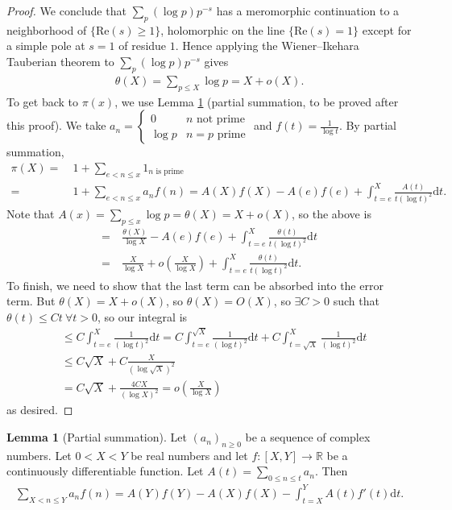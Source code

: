 \documentclass{article}
\theoremstyle{definition}
\newtheorem{lemma}[theorem]{Lemma}
\begin{document}
\begin{proof}
    We conclude that $\sum_{p}^{} (\log p) p^{-s}$ has a meromorphic continuation to a neighborhood of $\{\text{Re}(s)\ge 1\}$, holomorphic on the line $\{\text{Re}(s)=1\}$ except for a simple pole at $s=1$ of residue $1$. Hence applying the Wiener--Ikehara Tauberian theorem to $\sum_{p}^{} (\log p)p^{-s}$ gives
    \begin{align*}
        \theta(X) = \sum_{p\le X}^{} \log p  = X + o(X).
    \end{align*}
    To get back to $\pi(x)$, we use Lemma \ref{lemma4.7} (partial summation, to be proved after this proof). We take $a_n = \begin{cases}
        0 & n \text{ not prime} \\
        \log p & n = p \text{ prime}
    \end{cases}$ and $f(t) = \frac{1}{\log t}$. By partial summation,
    \begin{align*}
        \pi(X) =~& 1 + \sum_{e<n\le x}^{} 1_{n \text{ is prime}} \\
        =~& 1 + \sum_{e<n\le x}^{} a_nf(n) = A(X)f(X) - A(e)f(e) + \int_{t=e}^{X} \frac{A(t)}{t(\log t)^2}\mathrm{d}t.
    \end{align*}
    Note that $A(x) = \sum_{p\le x}^{} \log p = \theta(X) = X + o(X)$, so the above is 
    \begin{align*}
        =~& \frac{\theta(X)}{\log X} - A(e)f(e) + \int_{t=e}^{X} \frac{\theta(t)}{t(\log t)^2} \mathrm{d}t \\
        =~& \frac{X}{\log X} + o \left(\frac{X}{\log X}\right) + \int_{t=e}^{X} \frac{\theta(t)}{t (\log t)^2}\mathrm{d}t.
    \end{align*}
    To finish, we need to show that the last term can be absorbed into the error term. But $\theta(X) = X +o(X)$, so $\theta(X) = O(X)$, so $\exists C>0$ such that $\theta(t)\le Ct ~\forall t>0$, so our integral is 
    \begin{align*}
        &\le C \int_{t= e}^{X} \frac{1}{(\log t)^2}\mathrm{d}t =  C \int_{t=e}^{\sqrt{X}} \frac{1}{(\log t)^2}\mathrm{d}t + C \int_{t=\sqrt{X}}^{X} \frac{1}{(\log t)^2}\mathrm{d}t \\
        &\le C\sqrt{X} + C\frac{X}{(\log \sqrt{X})^2} \\
        &= C\sqrt{X} + \frac{4CX}{(\log X)^2} = o \left(\frac{X}{\log X}\right)
    \end{align*}
    as desired.
    
\end{proof}
\begin{lemma}[Partial summation]\label{lemma4.7}
    Let $(a_n)_{n\ge 0}$ be a sequence of complex numbers. Let $0<X<Y$ be real numbers and let $f:[X,Y] \to \mathbb{R}$ be a continuously differentiable function. Let $A(t) = \sum_{0\le n\le t}^{} a_n$. Then 
    \begin{align*}
        \sum_{X<n\le Y}^{} a_n f(n) = A(Y)f(Y) - A(X)f(X) - \int_{t=X}^{Y} A(t)f'(t) \mathrm{d}t.
    \end{align*}
\end{lemma}
\end{document}
